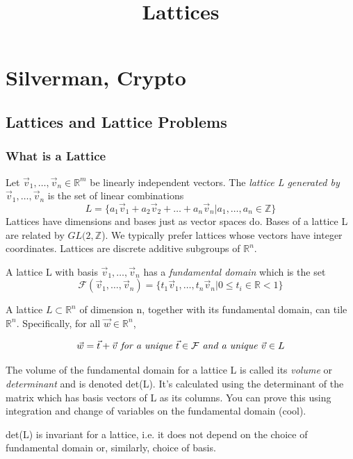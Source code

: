 \documentclass[10pt,a4paper]{article}
\theoremstyle{remark}
\begin{document}
\title{Lattices}
\maketitle
\tableofcontents

\section{Silverman, Crypto}
\subsection{Lattices and Lattice Problems}
\subsubsection{What is a Lattice}
Let $\vec{v}_1,\ldots,\vec{v}_n\in\mathbb{R}^m$ be linearly independent vectors. The \emph{lattice L generated by $\vec{v}_1,\ldots,\vec{v}_n$} is the set of linear combinations
$$L=\{a_1\vec{v}_1+a_2\vec{v}_2+\ldots+a_n\vec{v}_n\vert a_1,\ldots,a_n\in\mathbb{Z}\}$$
Lattices have dimensions and bases just as vector spaces do. Bases of a lattice L are related by $GL(2,\mathbb{Z}$). We typically prefer lattices whose vectors have integer coordinates. Lattices are discrete additive subgroups of $\mathbb{R}^n$.

A lattice L with basis $\vec{v}_1,\ldots,\vec{v}_n$ has a \emph{fundamental domain} which is the set
$$\mathcal{F}(\vec{v}_1,\ldots,\vec{v}_n)=\{t_1\vec{v}_1,\ldots,t_n\vec{v}_n\vert 0\leq t_i\in\mathbb{R} < 1\}$$

A lattice $L\subset\mathbb{R}^n$ of dimension n, together with its fundamental domain, can tile $\mathbb{R}^n$. Specifically, for all $\vec{w}\in\mathbb{R}^n$,

$$\vec{w}=\vec{t} + \vec{v} \emph{ for a unique } \vec{t}\in\mathcal{F} \emph{ and a unique }\vec{v}\in L$$

The volume of the fundamental domain for a lattice L is called its \emph{volume} or \emph{determinant} and is denoted det(L). It's calculated using the determinant of the matrix which has basis vectors of L as its columns. You can prove this using integration and change of variables on the fundamental domain (cool).

det(L) is invariant for a lattice, i.e. it does not depend on the choice of fundamental domain or, similarly, choice of basis.
\end{document}
